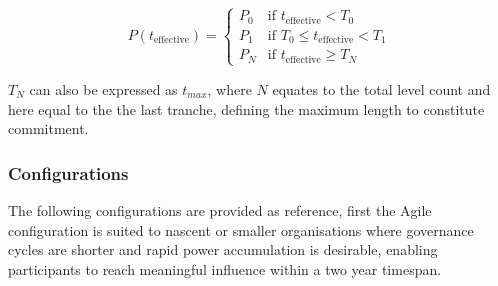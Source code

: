 \documentclass[a4paper,12pt]{article}
\begin{document}
\begin{equation}
    P(t_{\text{effective}}) = \begin{cases}
    P_0 & \text{if } t_{\text{effective}} < T_0 \\
    P_1 & \text{if } T_0 \leq t_{\text{effective}} < T_1 \\
    P_N & \text{if } t_{\text{effective}} \geq T_{N}
    \end{cases}
\end{equation}

\vspace{10pt}

$T_N$ can also be expressed as $t_{max}$, where $N$ equates to the total level count and here equal to the the last tranche, defining the maximum length to constitute commitment.

\subsubsection{\signifier Configurations}
The following configurations are provided as reference, first the Agile configuration is suited to nascent or smaller organisations where governance cycles are shorter and rapid power accumulation is desirable, enabling participants to reach meaningful influence within a two year timespan.

\vspace{5pt}
\end{document}
